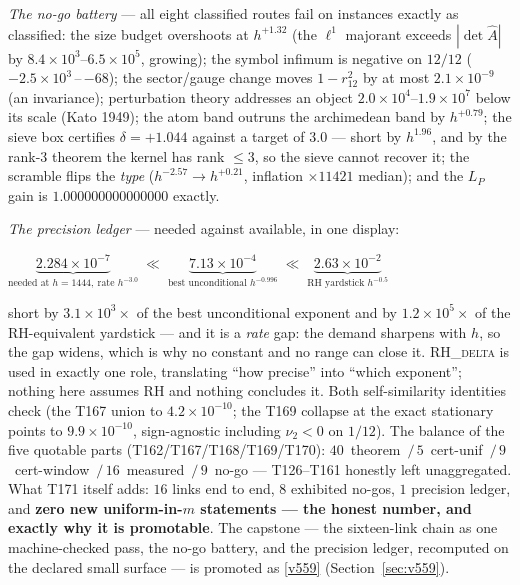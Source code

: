 \documentclass[11pt,a4paper]{article}
\begin{document}
\emph{The no-go battery} --- all eight classified routes fail on
instances exactly as classified: the size budget overshoots at
$h^{+1.32}$ (the $\ell^1$ majorant exceeds $|\det\hat A|$ by
$8.4\times10^{3}$--$6.5\times10^{5}$, growing); the symbol infimum is
negative on $12/12$ ($-2.5\times10^{3}$\,--\,$-68$); the sector/gauge
change moves $1-r_{12}^2$ by at most $2.1\times10^{-9}$ (an invariance);
perturbation theory addresses an object $2.0\times10^{4}$--$1.9\times
10^{7}$ below its scale (Kato 1949); the atom band outruns the
archimedean band by $h^{+0.79}$; the sieve box certifies
$\delta=+1.044$ against a target of $3.0$ --- short by $h^{1.96}$, and
by the rank-3 theorem the kernel has rank $\le3$, so the sieve cannot
recover it; the scramble flips the \emph{type} ($h^{-2.57}\to
h^{+0.21}$, inflation $\times11421$ median); and the $L_P$ gain is
$1.000000000000000$ exactly.

\emph{The precision ledger} --- needed against available, in one
display:
\begin{keyeq}$\displaystyle
\underbrace{2.284\times10^{-7}}_{\text{needed at }h=1444,\ \text{rate }h^{-3.0}}
\;\ll\;
\underbrace{7.13\times10^{-4}}_{\text{best unconditional }h^{-0.996}}
\;\ll\;
\underbrace{2.63\times10^{-2}}_{\text{RH yardstick }h^{-0.5}}$
\end{keyeq}
\noindent short by $3.1\times10^{3}\times$ of the best unconditional
exponent and by $1.2\times10^{5}\times$ of the RH-equivalent yardstick
--- and it is a \emph{rate} gap: the demand sharpens with $h$, so the
gap widens, which is why no constant and no range can close it.
\textsc{RH\_delta} is used in exactly one role, translating ``how
precise'' into ``which exponent''; nothing here assumes RH and nothing
concludes it. Both self-similarity identities check (the T167 union to
$4.2\times10^{-10}$; the T169 collapse at the exact stationary points to
$9.9\times10^{-10}$, sign-agnostic including $\nu_2<0$ on $1/12$). The
balance of the five quotable parts (T162/T167/T168/T169/T170):
$40$~theorem~$/\,5$~cert-unif~$/\,9$~cert-window~$/\,16$~measured~$/\,
9$~no-go --- T126--T161 honestly left unaggregated. What T171 itself
adds: $16$ links end to end, $8$ exhibited no-gos, $1$ precision ledger,
and \textbf{zero new uniform-in-$m$ statements --- the honest number,
and exactly why it is promotable}. The capstone --- the sixteen-link
chain as one machine-checked pass, the no-go battery, and the precision
ledger, recomputed on the declared small surface --- is promoted as
\vref{v559}  (Section~\ref{sec:v559}).
\end{document}
